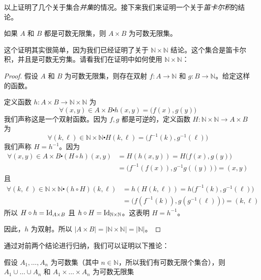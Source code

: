 以上证明了几个关于集合\emph{并集}的情况。接下来我们来证明一个关于\emph{笛卡尔积}的结论。

\begin{theorem}
    如果 $A$ 和 $B$ 都是可数无限集，则 $A \times B$ 为可数无限集。
\end{theorem}

这个证明其实很简单，因为我们已经证明了关于 $\mathbb{N} \times \mathbb{N}$ 结论。这个集合是笛卡尔积，并且是可数无穷集。请看我们在证明中如何使用 $\mathbb{N} \times \mathbb{N}$：

\begin{proof}
    假设 $A$ 和 $B$ 为可数无限集，则存在双射 $ f : A \to \mathbb{N}$ 和 $g : B \to \mathbb{N}$。给定这样的函数。

    定义函数 $h : A \times B \to \mathbb{N} \times \mathbb{N}$ 为
    \[\forall (x, y) \in A \times B \centerdot h(x, y) = \big(f(x), g(y)\big)\]
    我们声称这是一个双射函数。因为 $f, g$ 都是可逆的，定义函数 $H : \mathbb{N} \times \mathbb{N} \to A \times B$ 为
    \[\forall (k, \ell) \in \mathbb{N} \times \mathbb{N} \centerdot H(k, \ell) = \big(f^{-1}(k), g^{-1}(\ell)\big)\]
    我们声称 $H = h^{-1}$。因为
    \begin{align*}
        \forall (x, y) \in A \times B \centerdot (H \circ h)(x, y) & = H(h(x, y)) = H \big(f(x), g(y)\big)           \\
                                                                   & = \big(f^{-1}(f(x)), g^{-1}g((y))\big) = (x, y)
    \end{align*}
    且
    \begin{align*}
        \forall (k, \ell) \in \mathbb{N} \times \mathbb{N} \centerdot (h \circ H)(k, \ell) & = h(H(k, \ell)) = h\big(f^{-1}(k), g^{-1}(\ell)\big)  \\
                                                                                           & = \big(f(f^{-1}(k)), g(g^{-1}(\ell))\big) = (k, \ell)
    \end{align*}
    所以 $H \circ h = \text{Id}_{A \times B}$ 且 $h \circ H = \text{Id}_{\mathbb{N} \times \mathbb{N}}$。这表明 $H = h^{-1}$。

    因此，$h$ 为双射。所以 $|A \times B| = |\mathbb{N} \times \mathbb{N}| = |\mathbb{N}|$。
\end{proof}

通过对前两个结论进行归纳，我们可以证明以下推论：

\begin{corollary}\label{corollary7.6.21}
    假设 $A_1, \dots , A_n$ 为可数集（其中 $n \in \mathbb{N}$，所以我们有可数无限个集合），则 $A_1 \cup \dots \cup A_n$ 和 $A_1 \times \dots \times A_n$ 为可数无限集
\end{corollary}

